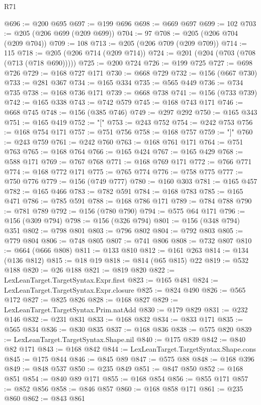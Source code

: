 \begin{lexlean}{R71}
\begin{coremodule}
@696 := @200 @695
@697 := @199 @696
@698 := @669 @697
@699 := 102
@703 := @205 (@206 @699 (@209 @699))
@704 := 97
@708 := @205 (@206 @704 (@209 @704))
@709 := 108
@713 := @205 (@206 @709 (@209 @709))
@714 := 115
@718 := @205 (@206 @714 (@209 @714))
@724 := @201 (@204 (@703 (@708 (@713 (@718 @690)))))
@725 := @200 @724
@726 := @199 @725
@727 := @698 @726
@729 := @168 @727 @171
@730 := @668 @729
@732 := @156 (@667 @730)
@733 := @281 @367
@734 := @165 @334
@735 := @565 @449
@736 := @734 @735
@738 := @168 @736 @171
@739 := @668 @738
@741 := @156 (@733 @739)
@742 := @165 @338
@743 := @742 @579
@745 := @168 @743 @171
@746 := @668 @745
@748 := @156 (@385 @746)
@749 := @297 @292
@750 := @165 @343
@751 := @165 @419
@752 := "["
@753 := @243 @752
@754 := @242 @753
@756 := @168 @754 @171
@757 := @751 @756
@758 := @168 @757
@759 := "]"
@760 := @243 @759
@761 := @242 @760
@763 := @168 @761 @171
@764 := @751 @763
@765 := @168 @764
@766 := @165 @424
@767 := @165 @429
@768 := @588 @171
@769 := @767 @768
@771 := @168 @769 @171
@772 := @766 @771
@774 := @168 @772 @171
@775 := @765 @774
@776 := @758 @775
@777 := @750 @776
@779 := @156 (@749 @777)
@780 := @160 @303
@781 := @165 @457
@782 := @165 @466
@783 := @782 @591
@784 := @168 @783
@785 := @165 @471
@786 := @785 @591
@788 := @168 @786 @171
@789 := @784 @788
@790 := @781 @789
@792 := @156 (@780 @790)
@794 := @575 @64 @171
@796 := @156 (@309 @794)
@798 := @156 (@326 @794)
@801 := @156 (@348 @794) @351
@802 := @798 @801
@803 := @796 @802
@804 := @792 @803
@805 := @779 @804
@806 := @748 @805
@807 := @741 @806
@808 := @732 @807
@810 := @664 (@666 @808)
@811 := @133 @810
@812 := @161 @263
@814 := @134 (@136 @812)
@815 := @18 @19
@818 := @814 (@65 @815) @22
@819 := @532 @188
@820 := @26 @188
@821 := @819 @820
@822 := LexLeanTarget.TargetSyntax.Expr.first
@823 := @165 @481
@824 := LexLeanTarget.TargetSyntax.Expr.closure
@825 := @824 @490
@826 := @565 @172
@827 := @825 @826
@828 := @168 @827
@829 := LexLeanTarget.TargetSyntax.Prim.natAdd
@830 := @179 @829
@831 := @232 @146
@832 := @231 @831
@833 := @168 @832
@834 := @833 @171
@835 := @565 @834
@836 := @830 @835
@837 := @168 @836
@838 := @575 @820
@839 := LexLeanTarget.TargetSyntax.Shape.nil
@840 := @175 @839
@842 := @840 @82 @171
@843 := @168 @842
@844 := LexLeanTarget.TargetSyntax.Shape.cons
@845 := @175 @844
@846 := @845 @89
@847 := @575 @88
@848 := @168 @396
@849 := @848 @537
@850 := @235 @849
@851 := @847 @850
@852 := @168 @851
@854 := @840 @89 @171
@855 := @168 @854
@856 := @855 @171
@857 := @852 @856
@858 := @846 @857
@860 := @168 @858 @171
@861 := @235 @860
@862 := @843 @861

\end{coremodule}
\end{lexlean}
